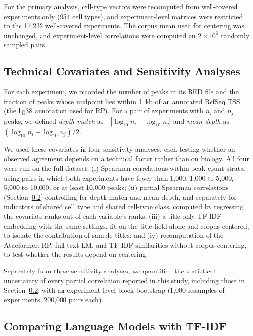 \documentclass[12pt]{article}
\begin{document}
For the primary analysis, cell-type vectors were recomputed from well-covered
experiments only (954 cell types), and experiment-level matrices were
restricted to the 17,232 well-covered experiments. The corpus mean used for
centering was unchanged, and experiment-level correlations were computed on
$2 \times 10^6$ randomly sampled pairs.

\subsection{Technical Covariates and Sensitivity Analyses}
\label{sec:tech_methods}

For each experiment, we recorded the number of peaks in its BED file and the
fraction of peaks whose midpoint lies within 1~kb of an annotated RefSeq TSS
(the hg38 annotation used for RP). For a pair of experiments with $n_i$ and
$n_j$ peaks, we defined \textit{depth match} as
$-|\log_{10} n_i - \log_{10} n_j|$ and \textit{mean depth} as
$(\log_{10} n_i + \log_{10} n_j)/2$.

We used these covariates in four sensitivity analyses, each testing whether an
observed agreement depends on a technical factor rather than on biology. All
four were run on the full dataset: (i) Spearman correlations within peak-count
strata, using pairs in which both experiments have fewer than 1,000, 1,000 to
5,000, 5,000 to 10,000, or at least 10,000 peaks; (ii) partial Spearman
correlations (Section~\ref{sec:lm_tfidf}) controlling for depth match and mean
depth, and separately for indicators of shared cell type and shared cell-type
class, computed by regressing the covariate ranks out of each variable's
ranks; (iii) a title-only TF-IDF embedding with the same settings, fit on the
title field alone and corpus-centered, to isolate the contribution of sample
titles; and (iv) recomputation of the Atacformer, RP, full-text LM, and TF-IDF
similarities without corpus centering, to test whether the results depend on
centering.

Separately from these sensitivity analyses, we quantified the statistical
uncertainty of every partial correlation reported in this study, including
those in Section~\ref{sec:lm_tfidf}, with an experiment-level block bootstrap
(1,000 resamples of experiments, 200,000 pairs each).

\subsection{Comparing Language Models with TF-IDF}
\label{sec:lm_tfidf}
\end{document}
